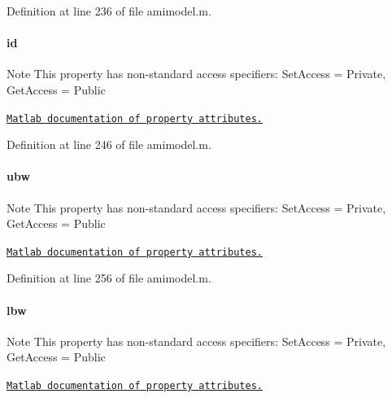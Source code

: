 Definition at line 236 of file amimodel.\+m.

\hypertarget{classamimodel_acf2488b95c97e0378c9bf49de3b50f28}{}
\paragraph[{id}]{\setlength{\rightskip}{0pt plus 5cm}id}\label{classamimodel_acf2488b95c97e0378c9bf49de3b50f28}
\begin{DoxyNote}{Note}
This property has non-\/standard access specifiers\+: {\ttfamily Set\+Access = Private, Get\+Access = Public} 

\href{http://www.mathworks.com/help/matlab/matlab_oop/property-attributes.html}{\tt Matlab documentation of property attributes.} 
\end{DoxyNote}


Definition at line 246 of file amimodel.\+m.

\hypertarget{classamimodel_a955c9d10635afed4ebc04c60010e5d40}{}
\paragraph[{ubw}]{\setlength{\rightskip}{0pt plus 5cm}ubw}\label{classamimodel_a955c9d10635afed4ebc04c60010e5d40}
\begin{DoxyNote}{Note}
This property has non-\/standard access specifiers\+: {\ttfamily Set\+Access = Private, Get\+Access = Public} 

\href{http://www.mathworks.com/help/matlab/matlab_oop/property-attributes.html}{\tt Matlab documentation of property attributes.} 
\end{DoxyNote}


Definition at line 256 of file amimodel.\+m.

\hypertarget{classamimodel_a784f5fb2b8eda576179be087c2a09a39}{}
\paragraph[{lbw}]{\setlength{\rightskip}{0pt plus 5cm}lbw}\label{classamimodel_a784f5fb2b8eda576179be087c2a09a39}
\begin{DoxyNote}{Note}
This property has non-\/standard access specifiers\+: {\ttfamily Set\+Access = Private, Get\+Access = Public} 

\href{http://www.mathworks.com/help/matlab/matlab_oop/property-attributes.html}{\tt Matlab documentation of property attributes.} 
\end{DoxyNote}


